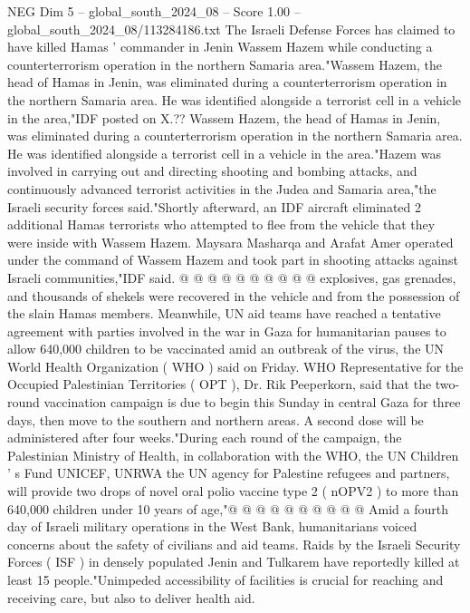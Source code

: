 \begin{textsample}{NEG Dim 5 – global\_south\_2024\_08 – Score 1.00 – global\_south\_2024\_08/113284186.txt}  \label{ex:f5_neg_178}
The Israeli Defense Forces has claimed to have killed Hamas ' commander in Jenin Wassem Hazem while conducting a counterterrorism operation in the northern Samaria area."Wassem Hazem, the head of Hamas in Jenin, was eliminated during a counterterrorism operation in the northern Samaria area.
He was identified alongside a terrorist cell in a vehicle in the area,"IDF posted on X.??
Wassem Hazem, the head of Hamas in Jenin, was eliminated during a counterterrorism operation in the northern Samaria area.
He was identified alongside a terrorist cell in a vehicle in the area."Hazem was involved in carrying out and directing shooting and bombing attacks, and continuously advanced terrorist activities in the Judea and Samaria area,"the Israeli security forces said."Shortly afterward, an IDF aircraft eliminated 2 additional Hamas terrorists who attempted to flee from the vehicle that they were inside with Wassem Hazem.
Maysara Masharqa and Arafat Amer operated under the command of Wassem Hazem and took part in shooting attacks against Israeli communities,"IDF said. @ @ @ @ @ @ @ @ @ @ explosives, gas grenades, and thousands of shekels were recovered in the vehicle and from the possession of the slain Hamas members.
Meanwhile, UN aid teams have reached a tentative agreement with parties involved in the war in Gaza for humanitarian pauses to allow 640,000 children to be vaccinated amid an outbreak of the virus, the UN World Health Organization ( WHO ) said on Friday.
WHO Representative for the Occupied Palestinian Territories ( OPT ), Dr.
Rik Peeperkorn, said that the two-round vaccination campaign is due to begin this Sunday in central Gaza for three days, then move to the southern and northern areas.
A second dose will be administered after four weeks."During each round of the campaign, the Palestinian Ministry of Health, in collaboration with the WHO, the UN Children ' s Fund UNICEF, UNRWA the UN agency for Palestine refugees and partners, will provide two drops of novel oral polio vaccine type 2 ( nOPV2 ) to more than 640,000 children under 10 years of age,"@ @ @ @ @ @ @ @ @ @ Amid a fourth day of Israeli military operations in the West Bank, humanitarians voiced concerns about the safety of civilians and aid teams.
Raids by the Israeli Security Forces ( ISF ) in densely populated Jenin and Tulkarem have reportedly killed at least 15 people."Unimpeded accessibility of facilities is crucial for reaching and receiving care, but also to deliver health aid.

\end{textsample}
